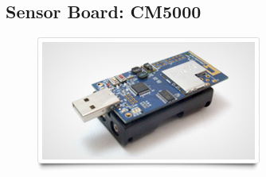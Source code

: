 \clearpage

\subsection{Sensor Board: CM5000}

\begin{figure}[H]
\centering
\includegraphics[scale=0.5]{Images/CM5000}
\end{figure}

